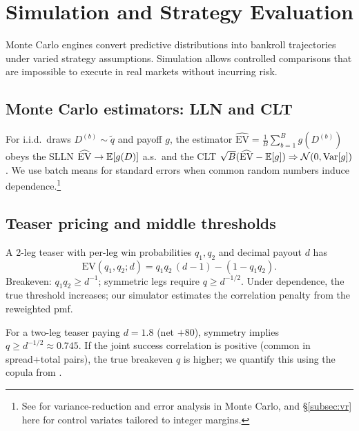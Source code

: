 \chapter{Simulation and Strategy Evaluation}
\label{chap:sim}

Monte Carlo engines convert predictive distributions into bankroll trajectories under varied strategy assumptions. Simulation allows controlled comparisons that are impossible to execute in real markets without incurring risk.

\section{Monte Carlo estimators: LLN and CLT}\label{sec:mc-lln}
For i.i.d.\ draws $D^{(b)}\sim \tilde q$ and payoff $g$, the estimator
$\widehat{\mathrm{EV}}=\tfrac1B\sum_{b=1}^B g(D^{(b)})$ obeys the SLLN
$\widehat{\mathrm{EV}}\to \mathbb{E}[g(D)]$ a.s.\ and the CLT
$\sqrt{B}(\widehat{\mathrm{EV}}-\mathbb{E}[g])\Rightarrow \mathcal{N}(0,\mathrm{Var}[g])$.
We use batch means for standard errors when common random numbers induce dependence.\footnote{See \citet{glasserman2003} for variance-reduction and error analysis in Monte Carlo, and \S\ref{subsec:vr} here for control variates tailored to integer margins.}

\section{Teaser pricing and middle thresholds}\label{sec:teaser-math}
A 2-leg teaser with per-leg win probabilities $q_1,q_2$ and decimal payout $d$ has
\begin{equation}\label{eq:teaser-ev}
\mathrm{EV}(q_1,q_2;d)=q_1q_2\,(d-1)-(1-q_1q_2).
\end{equation}
Breakeven: $q_1q_2\ge d^{-1}$; symmetric legs require $q\ge d^{-1/2}$. Under dependence, the
true threshold increases; our simulator estimates the correlation penalty from the reweighted pmf.

\begin{example}
For a two-leg teaser paying $d=1.8$ (net $+80$), symmetry implies $q\ge d^{-1/2}\approx 0.745$. If the joint success correlation is positive (common in spread+total pairs), the true breakeven $q$ is higher; we quantify this using the copula from .
\end{example}


